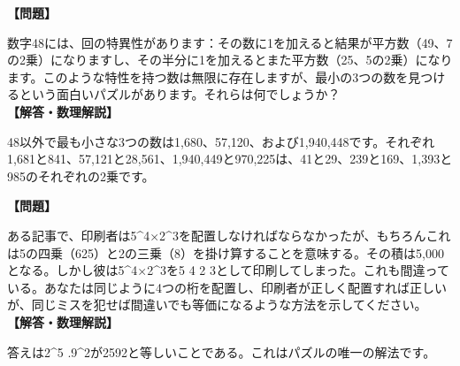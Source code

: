 \documentclass[10pt,a4paper,oneside,openany]{ltjsbook}
\begin{document}
\begin{tcolorbox}[colback=softblue,colframe=primaryblue,title=\textbf{第 114 問：興味深い数 （原題: CURIOUS NUMBERS.）},arc=2mm,boxrule=1pt,breakable]
\textbf{【問題】}\par\vspace{0.3em}
数字48には、回の特異性があります：その数に1を加えると結果が平方数（49、7の2乗）になりますし、その半分に1を加えるとまた平方数（25、5の2乗）になります。このような特性を持つ数は無限に存在しますが、最小の3つの数を見つけるという面白いパズルがあります。それらは何でしょうか？
\tcblower
\textbf{【解答・数理解説】}\par\vspace{0.3em}
48以外で最も小さな3つの数は1,680、57,120、および1,940,448です。それぞれ1,681と841、57,121と28,561、1,940,449と970,225は、41と29、239と169、1,393と985のそれぞれの2乗です。
\end{tcolorbox}

\begin{tcolorbox}[colback=softblue,colframe=primaryblue,title=\textbf{第 115 問：印刷者のミス （原題: A PRINTER'S ERROR.）},arc=2mm,boxrule=1pt,breakable]
\textbf{【問題】}\par\vspace{0.3em}
ある記事で、印刷者は5\textasciicircum{}4×2\textasciicircum{}3を配置しなければならなかったが、もちろんこれは5の四乗（625）と2の三乗（8）を掛け算することを意味する。その積は5,000となる。しかし彼は5\textasciicircum{}4×2\textasciicircum{}3を5 4 2 3として印刷してしまった。これも間違っている。あなたは同じように4つの桁を配置し、印刷者が正しく配置すれば正しいが、同じミスを犯せば間違いでも等価になるような方法を示してください。
\tcblower
\textbf{【解答・数理解説】}\par\vspace{0.3em}
答えは2\textasciicircum{}5 .9\textasciicircum{}2が2592と等しいことである。これはパズルの唯一の解法です。
\end{tcolorbox}
\end{document}
